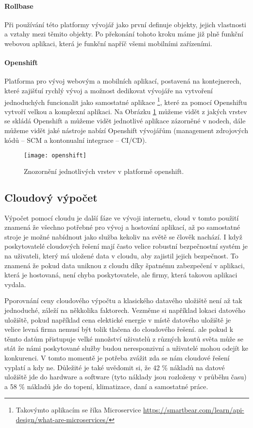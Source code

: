 \paragraph{Rollbase} Při používání této platformy vývojář jako první definuje objekty, jejich vlastnosti a vztahy mezi těmito objekty. Po překonání tohoto kroku máme již plně funkční webovou aplikaci, která je funkční napříč všemi mobilními zařízeními. \cite{what-is-low-code}
\paragraph{Openshift} Platforma pro vývoj webovým a mobilních aplikací, postavená na kontejnerech, které zajišťuí rychlý vývoj a možnost dedikovat vývojáře na vytvoření jednoduchých funcionalit jako samostatné aplikace \footnote{Takovýmto aplikacím se říka Microservice \url{https://smartbear.com/learn/api-design/what-are-microservices/}}, které za pomocí Openshiftu vytvoří velkou a komplexní aplikaci. Na Obrázku \ref{openshift-vrstvy} můžeme vidět z jakých vrstev se skládá Openshift a můžeme vidět jednotlivé aplikace zázorněné v nodech, dále můžeme vidět jaké nástroje nabízí Openshift vývojářům (management zdrojových kódů -- SCM a kontonualní integrace -- CI/CD).\cite{openshift-overview}
\begin{figure}[h]
\label{openshift-vrstvy}
\centering
\texttt{[image: openshift]}
\caption{Znozornění jednotlivých vrstev v platformě openshift.}
\end{figure}

\subsection{Cloudový výpočet}
\par Výpočet pomocí cloudu je další fáze ve vývoji internetu, cloud v tomto použití znamená že všechno potřebné pro vývoj a hostování aplikací, až po samostatné stroje je možné nabídnout jako služba kekoliv na světě se člověk nachází. I když poskytovatelé cloudových řešení mají často velice robustní bezpečnostní systém je na uživateli, který má uložené data v cloudu, aby zajistil jejich bezpečnost. To znamená že pokud data uniknou z cloudu díky špatnému zabezpečení v aplikaci, která je hostovaná, není chyba poskytovatele, ale firmy, která takovou aplikaci vydala.\cite{cloud-computing-dummies}

\par Pporovnání ceny cloudového výpočtu a klasického datavého uložiště není až tak jednoduché, záleží na někkolika faktorech. Vezměme si například lokaci datového uložiště, pokud například cena elektické energie v místě datového uložiště je velice levná firma nemusí být tolik tlačena do cloudového řešení. ale pokud k těmto datům přistupuje velké množství uživatelů z různých koutů světa může se stát že námi poskytované služby budou neresponzivní a uživatelé mohou odejít ke konkurenci. V tomto momentě je potřeba zvážit zda se nám cloudové řešení vyplatí a kdy ne. Důležité je také uvědomit si, že 42 \% nákladů na datové uložiště jde do hardware a software (tyto náklady jsou rozloženy v průběhu času) a 58 \% nákladů jde do topení, klimatizace, daní a samostatné práce. \cite{cloud-computing-dummies}

